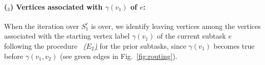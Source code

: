 \documentclass[Afour,sageh,times]{sagej}
\newcounter{mycounter}
\newcommand{\clause}[1]{\mathsf{cls}(#1)}
\newcommand{\ag}[2]{\langle#1,#2\rangle}
\renewcommand{\ap}[3]{\mathcal{\pi}_{{#1},{#2}}^{#3}}
\begin{document}

\paragraph{($_3$) Vertices associated with $\gamma(v_1)$ of $e$:}\label{sec:c} When the iteration over $S_1^e$ is over, we identify leaving vertices  among the vertices associated with the starting vertex label  $\gamma(v_1)$ of the current subtask $e$ following the  procedure ~\hyperref[sec:b]{\it ($E_2$)} for the prior subtasks, since $\gamma(v_1)$  becomes true before $\gamma(v_1, v_2)$ (see green edges in Fig.~\ref{fig:routing}).
\end{document}

